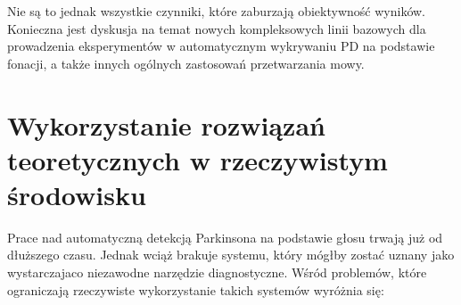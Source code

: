 Nie są to jednak wszystkie czynniki, które zaburzają obiektywność wyników. Konieczna jest dyskusja na temat nowych
kompleksowych linii bazowych dla prowadzenia eksperymentów w automatycznym wykrywaniu PD na podstawie fonacji,
a także innych ogólnych zastosowań przetwarzania mowy.

\section{Wykorzystanie rozwiązań teoretycznych w rzeczywistym środowisku}\label{sec:teoria-vs-praktyka}

Prace nad automatyczną detekcją Parkinsona na podstawie głosu trwają już od dłuższego czasu.
Jednak wciąż brakuje systemu, który mógłby zostać uznany jako wystarczajaco niezawodne narzędzie diagnostyczne.
Wśród problemów, które ograniczają rzeczywiste wykorzystanie takich systemów wyróżnia się:

